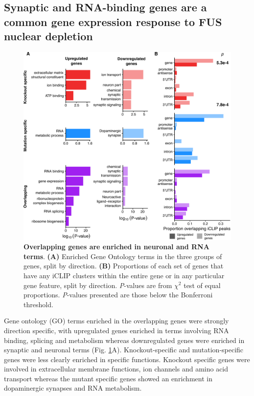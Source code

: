 \subsection{Synaptic and RNA-binding genes are a common gene expression response to FUS nuclear depletion}

\begin{figure}[h!]
	\centering
	\includegraphics[width=\textwidth]{Figures/06_fus_meta/expression_curated_go_terms.png}
	\caption[Overlapping genes are enriched in neuronal and RNA terms]{
		\textbf{Overlapping genes are enriched in neuronal and RNA terms}.
		\textbf{(A)} Enriched Gene Ontology terms in the three groups of genes, split by direction.
		\textbf{(B)} Proportions of each set of genes that have any iCLIP clusters within the entire gene or in any particular gene feature, split by direction. 
		\textit{P}-values are from $\chi^2$ test of equal proportions. \textit{P}-values presented are those below the Bonferroni threshold.
	}
	\label{fig:fus_expression_go}
\end{figure}


Gene ontology (GO) terms enriched in the overlapping genes were strongly direction specific, with upregulated genes enriched in terms involving RNA binding, splicing and metabolism whereas downregulated genes were enriched in synaptic and neuronal terms (Fig. \ref{fig:fus_expression_go}A).
Knockout-specific and mutation-specific genes were less clearly enriched in specific functions. 
Knockout specific genes were involved in extracellular membrane functions, ion channels and amino acid transport whereas the mutant specific genes showed an enrichment in dopaminergic synapses and RNA metabolism.



